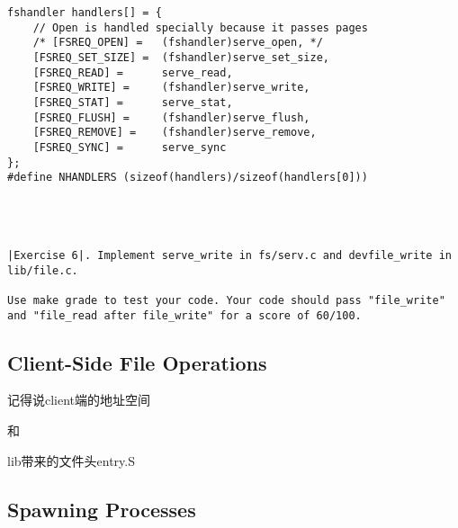 \documentclass{article}
\begin{document}
\begin{CJK*}{UTF8}{gkai}
\begin{lstlisting}[style=ccode, title={\scriptsize \ttfamily \bfseries fs/serv.c}]
fshandler handlers[] = {
	// Open is handled specially because it passes pages
	/* [FSREQ_OPEN] =	(fshandler)serve_open, */
	[FSREQ_SET_SIZE] =	(fshandler)serve_set_size,
	[FSREQ_READ] =		serve_read,
	[FSREQ_WRITE] =		(fshandler)serve_write,
	[FSREQ_STAT] =		serve_stat,
	[FSREQ_FLUSH] =		(fshandler)serve_flush,
	[FSREQ_REMOVE] =	(fshandler)serve_remove,
	[FSREQ_SYNC] =		serve_sync
};
#define NHANDLERS (sizeof(handlers)/sizeof(handlers[0]))
\end{lstlisting}


\begin{lstlisting}[style=ccode, title={\scriptsize \ttfamily \bfseries kern/: ()}]
\end{lstlisting}

\begin{lstlisting}[style=ccode, title={\scriptsize \ttfamily \bfseries kern/: ()}]
\end{lstlisting}

\begin{lstlisting}[style=ccode, title={\scriptsize \ttfamily \bfseries kern/: ()}]
\end{lstlisting}

\begin{lstlisting}[style=ccode, title={\scriptsize \ttfamily \bfseries kern/: ()}]
\end{lstlisting}

\begin{lstlisting}[style=exercise]
|Exercise 6|. Implement serve_write in fs/serv.c and devfile_write in lib/file.c.

Use make grade to test your code. Your code should pass "file_write" and "file_read after file_write" for a score of 60/100.
\end{lstlisting}


\subsection{Client-Side File Operations}

记得说client端的地址空间

和

lib带来的文件头entry.S
\subsection{Spawning Processes}

\begin{lstlisting}[style=ccode, title={\scriptsize \ttfamily \bfseries kern/: ()}]
\end{lstlisting}



\end{CJK*}
\end{document}
